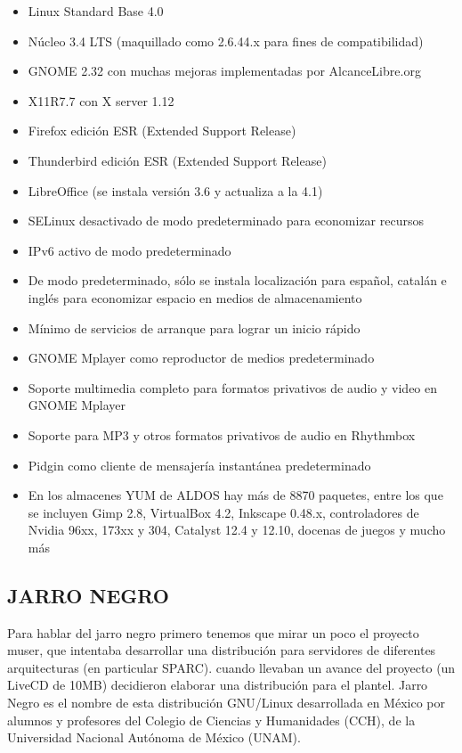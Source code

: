 \begin{itemize}
  \item Linux Standard Base 4.0
  \item Núcleo 3.4 LTS (maquillado como 2.6.44.x para fines de
	compatibilidad)
  \item GNOME 2.32 con muchas mejoras implementadas por
	AlcanceLibre.org
  \item X11R7.7 con X server 1.12
  \item Firefox edición ESR (Extended Support Release)
  \item Thunderbird edición ESR (Extended Support Release)
  \item LibreOffice (se instala versión 3.6 y actualiza a la 4.1)
  \item SELinux desactivado de modo predeterminado para
	economizar recursos
  \item IPv6 activo de modo predeterminado
  \item De modo predeterminado, sólo se instala localización para
	español, catalán e inglés para economizar espacio en
	medios de almacenamiento
  \item Mínimo de servicios de arranque para lograr un inicio
	rápido
  \item GNOME Mplayer como reproductor de medios
	predeterminado
  \item Soporte multimedia completo para formatos privativos
	de audio y video en GNOME Mplayer
  \item Soporte para MP3 y otros formatos privativos de audio en
	Rhythmbox
  \item Pidgin como cliente de mensajería instantánea
	predeterminado
  \item En los almacenes YUM de ALDOS hay más de 8870
	paquetes, entre los que se incluyen Gimp 2.8, VirtualBox
	4.2, Inkscape 0.48.x, controladores de Nvidia 96xx, 173xx
	y 304, Catalyst 12.4 y 12.10, docenas de juegos y mucho
	más
\end{itemize}

\subsection*{JARRO NEGRO}
Para hablar del jarro negro primero tenemos que mirar un poco
el proyecto muser, que intentaba desarrollar una distribución
para servidores de diferentes arquitecturas (en particular
SPARC). cuando llevaban un avance del proyecto (un LiveCD de
10MB) decidieron elaborar una distribución para el plantel.
Jarro Negro es el nombre de esta distribución GNU/Linux
desarrollada en México por alumnos y profesores del Colegio de
Ciencias y Humanidades (CCH), de la Universidad Nacional
Autónoma de México (UNAM).

